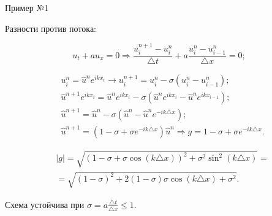 \documentclass[10pt,xcolor=pst,aspectratio=169]{beamer}
\begin{document}
\begin{frame}{Пример №1}

    \transdissolve[duration=0.1]
    \justifying
    \large

    Разности против потока:

    \[
        u_{t} + a u_{x} = 0 \Rightarrow \frac{u^{n + 1}_{i} - u^{n}_{i}}{\triangle t} + a \frac{u^{n}_{i} - u^{n}_{i - 1}}{\triangle x} = 0;
    \]

    \[
        \begin{split}
            &\boxed{u^{n}_{i} = \hat{u}^{n} e^{i k x_{i}}} \rightarrow \boxed{u^{n + 1}_{i} = u^{n}_{i} - \sigma \left( u^{n}_{i} - u^{n}_{i - 1} \right)}; \\
            &\hat{u}^{n + 1} e^{i k x_{i}} = \hat{u}^{n} e^{i k x_{i}} - \sigma \left( \hat{u}^{n} e^{i k x_{i}} - \hat{u}^{n} e^{i k x_{i - 1}} \right); \\
            &\hat{u}^{n + 1} = \hat{u}^{n} - \sigma \left( \hat{u}^{n} - \hat{u}^{n} e^{-i k \triangle x} \right); \\
            &\hat{u}^{n + 1} = \left( 1 - \sigma + \sigma e^{-i k \triangle x} \right) \hat{u}^{n} \Rightarrow \boxed{g = 1 - \sigma + \sigma e^{- i k \triangle x}}.
        \end{split}
    \]

    \[
        \begin{split}
            &|g| = \sqrt{ \left( 1 - \sigma + \sigma \cos{ \left( k \triangle x \right) } \right)^{2} + \sigma^2 \sin^{2}{ \left( k \triangle x \right) } } = \\
            &= \sqrt{ \left( 1 - \sigma \right)^{2} + 2 \left( 1 - \sigma \right) \sigma \cos{ \left( k \triangle x \right)} + \sigma^{2}}.
        \end{split}
    \]

    \begin{center}
        Схема устойчива при $\sigma = a \frac{\triangle t}{\triangle x} \leq 1$.
    \end{center}

\end{frame}
\end{document}
